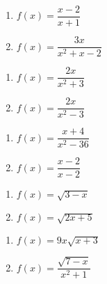 \begin{multicols}{2}
\begin{enumerate}
\setcounter{enumi}{\value{HW}}

\item $f(x) = \dfrac{x-2}{x+1}$
\item  $f(x) = \dfrac{3x}{x^2+x-2}$

\setcounter{HW}{\value{enumi}}
\end{enumerate}
\end{multicols}

\begin{multicols}{2}
\begin{enumerate}
\setcounter{enumi}{\value{HW}}

\item $f(x) = \dfrac{2x}{x^2+3}$
\item  $f(x) = \dfrac{2x}{x^2-3}$

\setcounter{HW}{\value{enumi}}
\end{enumerate}
\end{multicols}

\begin{multicols}{2}
\begin{enumerate}
\setcounter{enumi}{\value{HW}}

\item  $f(x) = \dfrac{x+4}{x^2 - 36}$
\item $f(x) = \dfrac{x-2}{x-2}$  

\setcounter{HW}{\value{enumi}}
\end{enumerate}
\end{multicols}

\begin{multicols}{2}
\begin{enumerate}
\setcounter{enumi}{\value{HW}}

\item  $f(x) = \sqrt{3-x}$
\item $f(x) = \sqrt{2x+5}$  

\setcounter{HW}{\value{enumi}}
\end{enumerate}
\end{multicols}

\begin{multicols}{2}
\begin{enumerate}
\setcounter{enumi}{\value{HW}}

\item  $f(x) = 9x\sqrt{x+3}$
\item $f(x) = \dfrac{\sqrt{7-x}}{x^2+1}$  

\setcounter{HW}{\value{enumi}}
\end{enumerate}
\end{multicols}

